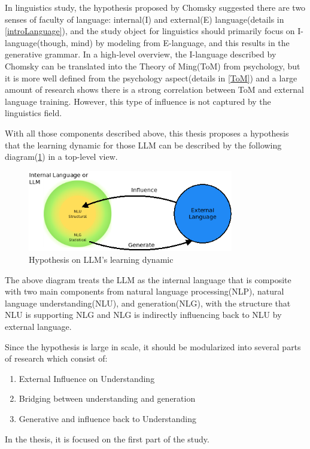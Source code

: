 \documentclass[12pt]{article}
\begin{document}
In linguistics study, the hypothesis proposed by Chomsky\cite{Hauser_2002} suggested there are two senses of faculty of language: internal(I) and external(E) language(details in \ref{introLanguage}), and the study object for linguistics should primarily focus on I-language(though, mind) by modeling from E-language, and this results in the generative grammar. In a high-level overview, the I-language described by Chomsky can be translated into the Theory of Ming(ToM) from psychology, but it is more well defined from the psychology aspect(details in \ref{ToM}) and a large amount of research shows there is a strong correlation between ToM and external language training. However, this type of influence is not captured by the linguistics field.

With all those components described above, this thesis proposes a hypothesis that the learning dynamic for those LLM can be described by the following diagram(\ref{fig:LLMhypothesis}) in a top-level view.
\begin{figure} [!h]
\begin{center}
\includegraphics[width=0.8\textwidth]{figures/Ilang_Elang_NLU_NLG.png}
\caption{Hypothesis on LLM's learning dynamic} 
\label{fig:LLMhypothesis}
\end{center}
\end{figure}

The above diagram treats the LLM as the internal language that is composite with two main components from natural language processing(NLP), natural language understanding(NLU), and generation(NLG), with the structure that NLU is supporting NLG and NLG is indirectly influencing back to NLU by external language. 

Since the hypothesis is large in scale, it should be modularized into several parts of research which consist of:
\begin{enumerate}
    \item External Influence on Understanding
    \item Bridging between understanding and generation
    \item Generative and influence back to Understanding
\end{enumerate}
In the thesis, it is focused on the first part of the study.
\end{document}
